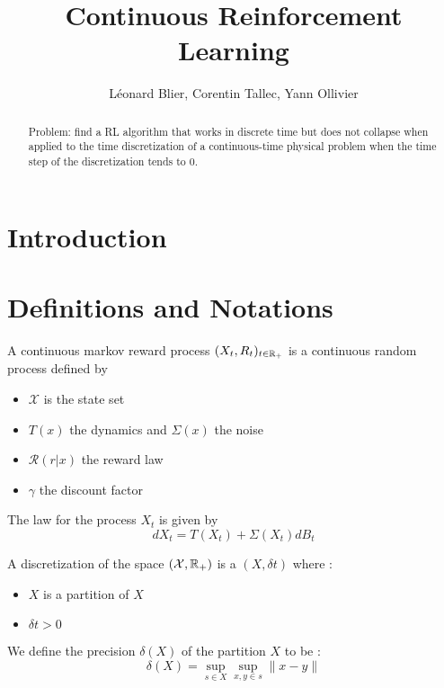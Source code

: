 \documentclass{article}
\title{Continuous Reinforcement Learning}
\author{L\'eonard Blier, Corentin Tallec, Yann Ollivier}
\begin{document}
\maketitle


\begin{abstract}
Problem: find a RL algorithm that works in discrete time but does not
collapse when applied to the time discretization of a continuous-time
physical problem when the time step of the discretization tends to $0$.
\end{abstract}

\section{Introduction}
\label{sec:introduction}


\section{Definitions and Notations}
\label{sec:definitions}

\begin{definition}
  A continuous markov reward process $(X_{t}, R_{t})_{t\in\mathbb{R}_{+}}$ is a continuous random process defined by 
  \begin{itemize}
  \item $\mathcal{X}$ is the state set 
  \item $T(x)$ the dynamics and $\Sigma (x)$ the noise
  \item $\mathcal{R}(r|x)$ the reward law
  \item $\gamma$ the discount factor
  \end{itemize}
  The law for the process $X_{t}$ is given by
  \begin{equation}
    \label{eq:eqdiffstoch}
    dX_{t} = T(X_{t}) + \Sigma(X_{t})dB_{t}
  \end{equation}
\end{definition}


\begin{definition}
  A discretization of the space $(\mathcal{X}, \mathbb{R}_{+})$ is a $(X, \delta t)$ where :
  \begin{itemize}
  \item $X$ is a partition of $X$
  \item $\delta t > 0$
  \end{itemize}
  We define the precision $\delta(X)$ of the partition $X$ to be :
  \begin{equation}
    \label{eq:2}
    \delta(X) = \sup_{s\in X}\sup_{x,y \in s}\|x-y\|
  \end{equation}
\end{definition}
\end{document}
